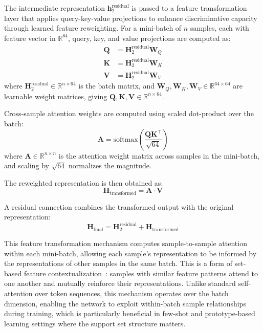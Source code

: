 \documentclass[10pt,letterpaper]{article}
\begin{document}
The intermediate representation $\mathbf{h}_2^{\text{residual}}$ is passed to a feature transformation layer that applies query-key-value projections to enhance discriminative capacity through learned feature reweighting. For a mini-batch of $n$ samples, each with feature vector in $\mathbb{R}^{64}$, query, key, and value projections are computed as:
\begin{align}
    \mathbf{Q} &= \mathbf{H}_2^{\text{residual}} \mathbf{W}_Q \\
    \mathbf{K} &= \mathbf{H}_2^{\text{residual}} \mathbf{W}_K \\
    \mathbf{V} &= \mathbf{H}_2^{\text{residual}} \mathbf{W}_V
\end{align}
where $\mathbf{H}_2^{\text{residual}} \in \mathbb{R}^{n \times 64}$ is the batch matrix, and $\mathbf{W}_Q, \mathbf{W}_K, \mathbf{W}_V \in \mathbb{R}^{64 \times 64}$ are learnable weight matrices, giving $\mathbf{Q}, \mathbf{K}, \mathbf{V} \in \mathbb{R}^{n \times 64}$.

Cross-sample attention weights are computed using scaled dot-product over the batch:
\begin{equation}
    \mathbf{A} = \text{softmax}\left(\frac{\mathbf{Q}\mathbf{K}^\top}{\sqrt{64}}\right)
\end{equation}
where $\mathbf{A} \in \mathbb{R}^{n \times n}$ is the attention weight matrix across samples in the mini-batch, and scaling by $\sqrt{64}$ normalizes the magnitude.

The reweighted representation is then obtained as:
\begin{equation}
    \mathbf{H}_{\text{transformed}} = \mathbf{A} \cdot \mathbf{V}
\end{equation}

A residual connection combines the transformed output with the original representation:
\begin{equation}
    \mathbf{H}_{\text{final}} = \mathbf{H}_2^{\text{residual}} + \mathbf{H}_{\text{transformed}}
\end{equation}

This feature transformation mechanism computes sample-to-sample attention within each mini-batch, allowing each sample's representation to be informed by the representations of other samples in the same batch. This is a form of set-based feature contextualization~\cite{ref51}: samples with similar feature patterns attend to one another and mutually reinforce their representations. Unlike standard self-attention over token sequences, this mechanism operates over the batch dimension, enabling the network to exploit within-batch sample relationships during training, which is particularly beneficial in few-shot and prototype-based learning settings where the support set structure matters.
\end{document}
